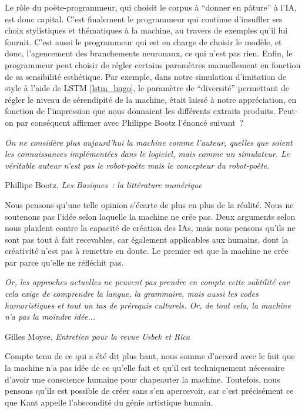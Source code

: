 \documentclass{article}
\newenvironment{citationbox}
{\begin{center}
		\begin{minipage}{.8\textwidth}
		}
		{
		\end{minipage}	
\end{center}
}
\begin{document}
				Le rôle du poète-programmeur, qui choisit le corpus à ``donner en pâture'' à l'IA, est donc capital. C'est finalement le programmeur qui continue d'insuffler ses choix stylistiques et thématiques à la machine, au travers de exemples qu'il lui fournit. C'est aussi le programmeur qui est en charge de choisir le modèle, et donc, l'agencement des branchements neuronaux, ce qui n'est pas rien. Enfin, le programmeur peut choisir de régler certains paramètres manuellement en fonction de sa sensibilité esthétique. Par exemple, dans notre simulation d'imitation de style à l'aide de LSTM \ref{lstm_hugo}, le paramètre de ``diversité'' permettant de régler le niveau de sérendipité de la machine, était laissé à notre appréciation, en fonction de l'impression que nous donnaient les différents extraits produits. Peut-on par conséquent affirmer avec Philippe Bootz l'énoncé suivant~?
				\begin{citationbox}
					\textit{On ne considère plus aujourd’hui la machine comme l’auteur, quelles que soient les connaissances implémentées dans le logiciel, mais comme un simulateur. Le véritable auteur n’est pas le robot-poète mais le concepteur du robot-poète.}
					\begin{flushright}
						Phillipe Bootz, \textit{Les Basiques~: la littérature numérique} \cite{bootz2006}
					\end{flushright}
				\end{citationbox}
				
				Nous pensons qu'une telle opinion s'écarte de plus en plus de la réalité. Nous ne soutenons pas l'idée selon laquelle la machine ne crée pas. Deux arguments selon nous plaident contre la capacité de création des IAs, mais nous pensons qu'ils ne sont pas tout à fait recevables, car également applicables aux humains, dont la créativité n'est pas à remettre en doute. Le premier est que la machine ne crée par parce qu'elle ne réfléchit pas.
				\begin{citationbox}
					\textit{Or, les approches actuelles ne peuvent pas prendre en compte cette subtilité car cela exige de comprendre la langue, la grammaire, mais aussi les codes humoristiques et tout un tas de prérequis culturels. Or, de tout cela, la machine n’a pas la moindre idée...}
					\begin{flushright}
						Gilles Moyse, \textit{Entretien pour la revue Usbek et Rica} \cite{edin2018}
					\end{flushright}
				\end{citationbox}
				Compte tenu de ce qui a été dit plus haut, nous somme d'accord avec le fait que la machine n'a pas idée de ce qu'elle fait et qu'il est techniquement nécessaire d'avoir une conscience humaine pour chapeauter la machine. Toutefois, nous pensons qu'ils est possible de créer sans s'en apercevoir, car c'est précisément ce que Kant appelle l'abscondité du génie artistique humain.
				
\end{document}
